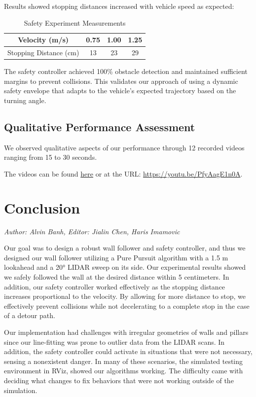 \documentclass{article}
\begin{document}
Results showed stopping distances increased with vehicle speed as expected:

\begin{table}[H]
\centering
\caption{Safety Experiment Measurements}
\begin{tabular}{|c|c|c|c|}
\hline
Velocity (m/s) & 0.75 & 1.00 & 1.25 \\
\hline
Stopping Distance (cm) & 13 & 23 & 29 \\
\hline
\end{tabular}
\end{table}

The safety controller achieved 100\% obstacle detection and maintained sufficient margins to prevent collisions. This validates our approach of using a dynamic safety envelope that adapts to the vehicle's expected trajectory based on the turning angle.

\subsection{Qualitative Performance Assessment}
We observed qualitative aspects of our performance through 12 recorded videos ranging from 15 to 30 seconds.

The videos can be found \href{https://youtu.be/PfyAagE1n0A}{here} or at the URL: \url{https://youtu.be/PfyAagE1n0A}.


\section{Conclusion}
\noindent\textit{Author: Alvin Banh, Editor: Jialin Chen, Haris Imamovic}

Our goal was to design a robust wall follower and safety controller, and thus we designed our wall follower utilizing a Pure Pursuit algorithm with a 1.5 m lookahead and a 20° LIDAR sweep on its side. Our experimental results showed we safely followed the wall at the desired distance within 5 centimeters. In addition, our safety controller worked effectively as the stopping distance increases proportional to the velocity. By allowing for more distance to stop, we effectively prevent collisions while not decelerating to a complete stop in the case of a detour path.

Our implementation had challenges with irregular geometries of walls and pillars since our line-fitting was prone to outlier data from the LIDAR scans. In addition, the safety controller could activate in situations that were not necessary, sensing a nonexistent danger. In many of these scenarios, the simulated testing environment in RViz, showed our algorithms working. The difficulty came with deciding what changes to fix behaviors that were not working outside of the simulation.
\end{document}
